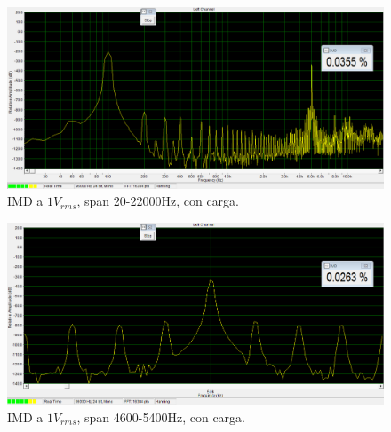 \begin{figure}[H]
\centering
\includegraphics[width=\textwidth]{img/Distorsion/IMD_1V_20_22000_carga.png}
\caption{IMD a $1V_{rms}$, span 20-22000Hz, con carga.}
\label{IMD7} 
\end{figure}

\begin{figure}[H]
\centering
\includegraphics[width=\textwidth]{img/Distorsion/IMD_1V_4600_5400_carga.png}
\caption{IMD a $1V_{rms}$, span 4600-5400Hz, con carga.}
\label{IMD8} 
\end{figure}
